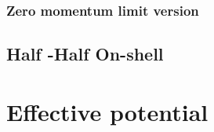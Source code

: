 \subsubsection{Zero momentum limit version}
\subsection{Half \MSbar-Half On-shell}
\section{Effective potential}

 \\

